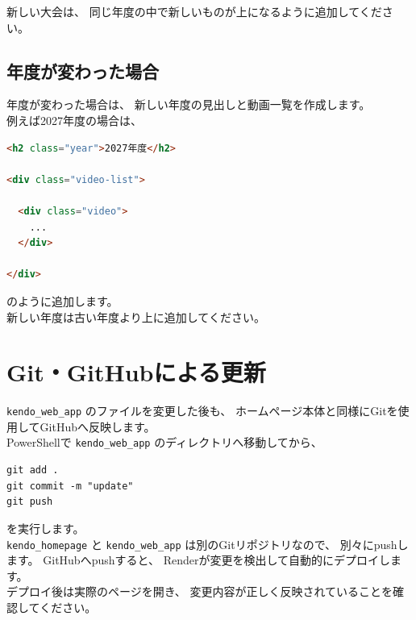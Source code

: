\documentclass[a4paper,11pt]{ltjsarticle}
\begin{document}
新しい大会は、
同じ年度の中で新しいものが上になるように追加してください。


\subsection{年度が変わった場合}

年度が変わった場合は、
新しい年度の見出しと動画一覧を作成します。\\
例えば2027年度の場合は、

\begin{lstlisting}[language=HTML]
<h2 class="year">2027年度</h2>

<div class="video-list">

  <div class="video">
    ...
  </div>

</div>
\end{lstlisting}

のように追加します。\\
新しい年度は古い年度より上に追加してください。



\section{Git・GitHubによる更新}

\texttt{kendo\_web\_app} のファイルを変更した後も、
ホームページ本体と同様にGitを使用してGitHubへ反映します。\\
PowerShellで
\texttt{kendo\_web\_app} のディレクトリへ移動してから、

\begin{lstlisting}
git add .
git commit -m "update"
git push
\end{lstlisting}

を実行します。\\
\texttt{kendo\_homepage} と
\texttt{kendo\_web\_app} は別のGitリポジトリなので、
別々にpushします。
GitHubへpushすると、
Renderが変更を検出して自動的にデプロイします。\\
デプロイ後は実際のページを開き、
変更内容が正しく反映されていることを確認してください。
\end{document}
